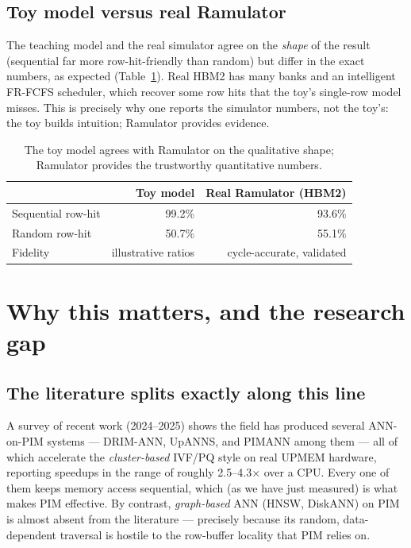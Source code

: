 \documentclass[11pt,a4paper]{article}
\begin{document}
\subsection{Toy model versus real Ramulator}

The teaching model and the real simulator agree on the \emph{shape} of the result (sequential far
more row-hit-friendly than random) but differ in the exact numbers, as expected
(Table~\ref{tab:toy}). Real HBM2 has many banks and an intelligent FR-FCFS scheduler, which recover
some row hits that the toy's single-row model misses. This is precisely why one reports the
simulator numbers, not the toy's: the toy builds intuition; Ramulator provides evidence.

\begin{table}[h]
\centering
\renewcommand{\arraystretch}{1.25}
\begin{tabular}{lrr}
\toprule
 & \textbf{Toy model} & \textbf{Real Ramulator (HBM2)} \\
\midrule
Sequential row-hit & 99.2\% & 93.6\% \\
Random row-hit     & 50.7\% & 55.1\% \\
Fidelity           & illustrative ratios & cycle-accurate, validated \\
\bottomrule
\end{tabular}
\caption{The toy model agrees with Ramulator on the qualitative shape; Ramulator provides the
trustworthy quantitative numbers.}
\label{tab:toy}
\end{table}

\section{Why this matters, and the research gap}

\subsection{The literature splits exactly along this line}

A survey of recent work (2024--2025) shows the field has produced several ANN-on-PIM systems ---
DRIM-ANN, UpANNS, and PIMANN among them --- all of which accelerate the \emph{cluster-based} IVF/PQ
style on real UPMEM hardware, reporting speedups in the range of roughly 2.5--4.3$\times$ over a CPU.
Every one of them keeps memory access sequential, which (as we have just measured) is what makes PIM
effective. By contrast, \emph{graph-based} ANN (HNSW, DiskANN) on PIM is almost absent from the
literature --- precisely because its random, data-dependent traversal is hostile to the row-buffer
locality that PIM relies on.
\end{document}
